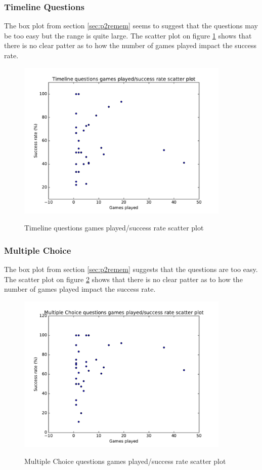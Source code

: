 \subsubsection{Timeline Questions}
The box plot from section \ref{sec:p2remem} seems to suggest that the questions may be too easy but the range is quite large. The scatter plot on figure \ref{fig:timeScatter} shows that there is no clear patter as to how the number of games played impact the success rate.
\begin{figure}
\centering
{\includegraphics[width=4in]{images/timeline_scatter.pdf}}
\caption{Timeline questions games played/success rate scatter plot}
\label{fig:timeScatter}
\end{figure}

\subsubsection{Multiple Choice}
The box plot from section \ref{sec:p2remem} suggests that the questions are too easy. The scatter plot on figure \ref{fig:mcScatter} shows that there is no clear patter as to how the number of games played impact the success rate.
\begin{figure}
\centering
{\includegraphics[width=4in]{images/mc_scatter.pdf}}
\caption{Multiple Choice questions games played/success rate scatter plot}
\label{fig:mcScatter}
\end{figure}
